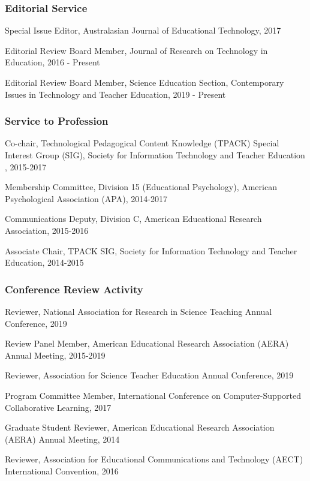 \documentclass[]{article}
\begin{document}
\subsubsection{Editorial Service}\label{editorial-service}

Special Issue Editor, Australasian Journal of Educational Technology,
2017

Editorial Review Board Member, Journal of Research on Technology in
Education, 2016 - Present

Editorial Review Board Member, Science Education Section, Contemporary
Issues in Technology and Teacher Education, 2019 - Present

\subsubsection{Service to Profession}\label{service-to-profession}

Co-chair, Technological Pedagogical Content Knowledge (TPACK) Special
Interest Group (SIG), Society for Information Technology and Teacher
Education , 2015-2017

Membership Committee, Division 15 (Educational Psychology), American
Psychological Association (APA), 2014-2017

Communications Deputy, Division C, American Educational Research
Association, 2015-2016

Associate Chair, TPACK SIG, Society for Information Technology and
Teacher Education, 2014-2015

\subsubsection{Conference Review
Activity}\label{conference-review-activity}

Reviewer, National Association for Research in Science Teaching Annual
Conference, 2019

Review Panel Member, American Educational Research Association (AERA)
Annual Meeting, 2015-2019

Reviewer, Association for Science Teacher Education Annual Conference,
2019

Program Committee Member, International Conference on Computer-Supported
Collaborative Learning, 2017

Graduate Student Reviewer, American Educational Research Association
(AERA) Annual Meeting, 2014

Reviewer, Association for Educational Communications and Technology
(AECT) International Convention, 2016
\end{document}
